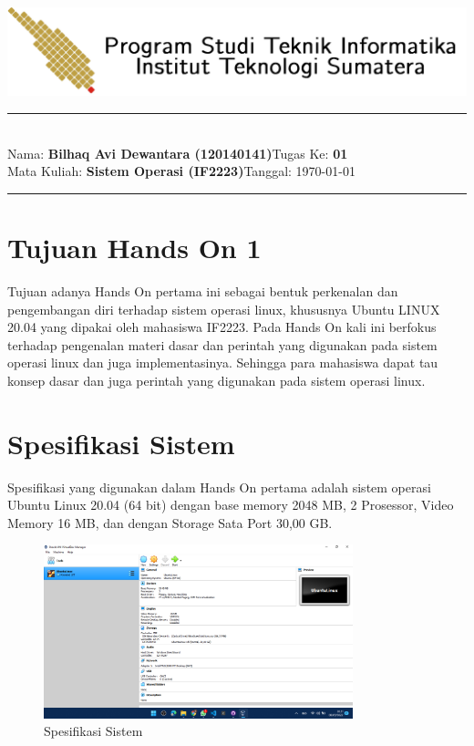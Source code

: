 \documentclass[11pt,a4paper]{article}
\newcommand{\stuid}{120140141}
\newcommand{\student}{\textbf{Bilhaq Avi Dewantara (\stuid{})}}
\newcommand{\course}{\textbf{Sistem Operasi (IF2223)}}
\newcommand{\assignment}{\textbf{01}} %
\begin{document}
\thispagestyle{empty}
\begin{center}
	\includegraphics[scale = 0.15]{Figure/ifitera-header.png}
	\vspace{0.1cm}
\end{center}
\noindent
{\large
\rule{17cm}{0.2cm}\\[0.3cm]
Nama: \student \hfill Tugas Ke: \assignment\\[0.1cm]
Mata Kuliah: \course \hfill Tanggal: \today\\
\rule{17cm}{0.05cm}
\vspace{0.1cm}
}


\section{Tujuan Hands On 1}
    Tujuan adanya Hands On pertama ini sebagai bentuk perkenalan dan pengembangan diri terhadap sistem operasi linux, 
	khususnya Ubuntu LINUX 20.04 yang dipakai oleh mahasiswa IF2223. Pada Hands On kali ini berfokus terhadap pengenalan 
	materi dasar dan perintah yang digunakan pada sistem operasi linux dan juga implementasinya. Sehingga para mahasiswa 
	dapat tau konsep dasar dan juga perintah yang digunakan pada sistem operasi linux.

\section{Spesifikasi Sistem}
    Spesifikasi yang digunakan dalam Hands On pertama adalah sistem operasi Ubuntu Linux 20.04 (64 bit) dengan base memory 2048 MB, 
	2 Prosessor, Video Memory 16 MB, dan dengan Storage Sata Port 30,00 GB.
	\begin{figure}[h]
		\centering
		\includegraphics[width=0.8\textwidth]{Figure/Spek Sistem.png}
		\caption{Spesifikasi Sistem}
	\end{figure}
\end{document}
